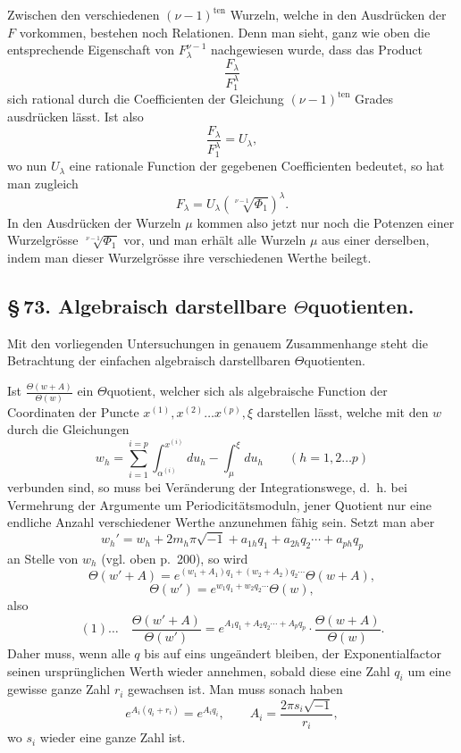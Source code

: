 \documentclass[10pt]{article}
\begin{document}
Zwischen den verschiedenen \((\nu-1)^{\text{ten}}\) Wurzeln, welche in den Ausdrücken der \(F\) vorkommen, bestehen noch Relationen. Denn man sieht, ganz wie oben die entsprechende Eigenschaft von \(F_\lambda^{\nu-1}\) nachgewiesen wurde, dass das Product
\[
\frac{F_\lambda}{F_1^\lambda}
\]
sich rational durch die Coefficienten der Gleichung \((\nu-1)^{\text{ten}}\) Grades ausdrücken lässt. Ist also
\[
\frac{F_\lambda}{F_1^\lambda}=U_\lambda,
\]
wo nun \(U_\lambda\) eine rationale Function der gegebenen Coefficienten bedeutet, so hat man zugleich
\[
F_\lambda=U_\lambda\left(\sqrt[\nu-1]{\Phi_1}\right)^\lambda.
\]
In den Ausdrücken der Wurzeln \(\mu\) kommen also jetzt nur noch die Potenzen einer Wurzelgrösse \(\sqrt[\nu-1]{\Phi_1}\) vor, und man erhält alle Wurzeln \(\mu\) aus einer derselben, indem man dieser Wurzelgrösse ihre verschiedenen Werthe beilegt.

\subsection*{\S\,73. Algebraisch darstellbare \(\Theta\)quotienten.}

Mit den vorliegenden Untersuchungen in genauem Zusammenhange steht die Betrachtung der einfachen algebraisch darstellbaren \(\Theta\)quotienten.




Ist \(\frac{\Theta(w+A)}{\Theta(w)}\) ein \(\Theta\)quotient, welcher sich als algebraische Function der Coordinaten der Puncte \(x^{(1)},x^{(2)}\ldots x^{(p)},\xi\) darstellen lässt, welche mit den \(w\) durch die Gleichungen
\[
w_h=\sum_{i=1}^{i=p}\int_{\alpha^{(i)}}^{x^{(i)}}du_h-\int_{\mu}^{\xi}du_h
\qquad(h=1,2\ldots p)
\]
verbunden sind, so muss bei Veränderung der Integrationswege, d.~h. bei Vermehrung der Argumente um Periodicitätsmoduln, jener Quotient nur eine endliche Anzahl verschiedener Werthe anzunehmen fähig sein. Setzt man aber
\[
w_h'=w_h+2m_h\pi\sqrt{-1}+a_{1h}q_1+a_{2h}q_2\cdots+a_{ph}q_p
\]
an Stelle von \(w_h\) (vgl. oben p.~200), so wird
\[
\Theta(w'+A)=e^{(w_1+A_1)q_1+(w_2+A_2)q_2\cdots}\Theta(w+A),
\]
\[
\Theta(w')=e^{w_1q_1+w_2q_2\cdots}\Theta(w),
\]
also
\[
(1)\ldots\quad
\frac{\Theta(w'+A)}{\Theta(w')}
=
e^{A_1q_1+A_2q_2\cdots+A_pq_p}\cdot
\frac{\Theta(w+A)}{\Theta(w)}.
\]
Daher muss, wenn alle \(q\) bis auf eins ungeändert bleiben, der Exponentialfactor seinen ursprünglichen Werth wieder annehmen, sobald diese eine Zahl \(q_i\) um eine gewisse ganze Zahl \(r_i\) gewachsen ist. Man muss sonach haben
\[
e^{A_i(q_i+r_i)}=e^{A_iq_i},\qquad
A_i=\frac{2\pi s_i\sqrt{-1}}{r_i},
\]
wo \(s_i\) wieder eine ganze Zahl ist.
\end{document}
